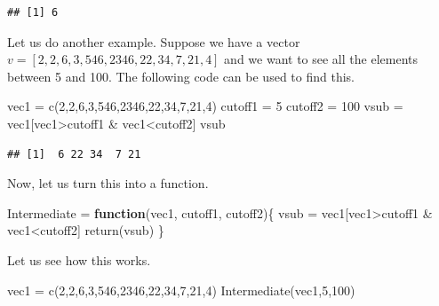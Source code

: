 \documentclass[
]{article}
\newenvironment{Shaded}{\begin{snugshade}}{\end{snugshade}}
\newcommand{\ControlFlowTok}[1]{\textcolor[rgb]{0.13,0.29,0.53}{\textbf{#1}}}
\newcommand{\DecValTok}[1]{\textcolor[rgb]{0.00,0.00,0.81}{#1}}
\newcommand{\FunctionTok}[1]{\textcolor[rgb]{0.00,0.00,0.00}{#1}}
\newcommand{\NormalTok}[1]{#1}
\newcommand{\OtherTok}[1]{\textcolor[rgb]{0.56,0.35,0.01}{#1}}
\newcommand{\SpecialCharTok}[1]{\textcolor[rgb]{0.00,0.00,0.00}{#1}}
\begin{document}
\begin{verbatim}
## [1] 6
\end{verbatim}

Let us do another example. Suppose we have a vector
\(v = [2,2,6,3,546,2346,22,34,7,21,4]\) and we want to see all the
elements between 5 and 100. The following code can be used to find this.

\begin{Shaded}
\begin{Highlighting}[]
\NormalTok{vec1 }\OtherTok{=} \FunctionTok{c}\NormalTok{(}\DecValTok{2}\NormalTok{,}\DecValTok{2}\NormalTok{,}\DecValTok{6}\NormalTok{,}\DecValTok{3}\NormalTok{,}\DecValTok{546}\NormalTok{,}\DecValTok{2346}\NormalTok{,}\DecValTok{22}\NormalTok{,}\DecValTok{34}\NormalTok{,}\DecValTok{7}\NormalTok{,}\DecValTok{21}\NormalTok{,}\DecValTok{4}\NormalTok{)}
\NormalTok{cutoff1 }\OtherTok{=} \DecValTok{5}
\NormalTok{cutoff2 }\OtherTok{=} \DecValTok{100} 
\NormalTok{vsub }\OtherTok{=}\NormalTok{ vec1[vec1}\SpecialCharTok{\textgreater{}}\NormalTok{cutoff1 }\SpecialCharTok{\&}\NormalTok{ vec1}\SpecialCharTok{\textless{}}\NormalTok{cutoff2]}
\NormalTok{vsub}
\end{Highlighting}
\end{Shaded}

\begin{verbatim}
## [1]  6 22 34  7 21
\end{verbatim}

Now, let us turn this into a function.

\begin{Shaded}
\begin{Highlighting}[]
\NormalTok{Intermediate }\OtherTok{=} \ControlFlowTok{function}\NormalTok{(vec1, cutoff1, cutoff2)\{}
\NormalTok{  vsub }\OtherTok{=}\NormalTok{ vec1[vec1}\SpecialCharTok{\textgreater{}}\NormalTok{cutoff1 }\SpecialCharTok{\&}\NormalTok{ vec1}\SpecialCharTok{\textless{}}\NormalTok{cutoff2]}
  \FunctionTok{return}\NormalTok{(vsub)}
\NormalTok{\}}
\end{Highlighting}
\end{Shaded}

Let us see how this works.

\begin{Shaded}
\begin{Highlighting}[]
\NormalTok{vec1 }\OtherTok{=} \FunctionTok{c}\NormalTok{(}\DecValTok{2}\NormalTok{,}\DecValTok{2}\NormalTok{,}\DecValTok{6}\NormalTok{,}\DecValTok{3}\NormalTok{,}\DecValTok{546}\NormalTok{,}\DecValTok{2346}\NormalTok{,}\DecValTok{22}\NormalTok{,}\DecValTok{34}\NormalTok{,}\DecValTok{7}\NormalTok{,}\DecValTok{21}\NormalTok{,}\DecValTok{4}\NormalTok{)}
\FunctionTok{Intermediate}\NormalTok{(vec1,}\DecValTok{5}\NormalTok{,}\DecValTok{100}\NormalTok{)}
\end{Highlighting}
\end{Shaded}
\end{document}
